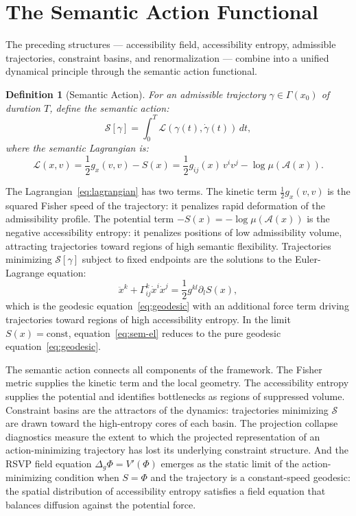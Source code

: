 \documentclass[12pt, oneside]{book}
\theoremstyle{plain-flyxion}
\theoremstyle{definition-flyxion}
\newtheorem{definition}[theorem]{Definition}
\newcommand{\A}{\mathcal{A}}
\begin{document}
\section{The Semantic Action Functional}

The preceding structures --- accessibility field, accessibility entropy, admissible
trajectories, constraint basins, and renormalization --- combine into a unified dynamical
principle through the semantic action functional.

\begin{definition}[Semantic Action]\label{def:action}
For an admissible trajectory $\gamma \in \Gamma(x_0)$ of duration $T$, define the
\emph{semantic action}:
\begin{equation}\label{eq:sem-action}
\mathcal{S}[\gamma] = \int_0^T \mathcal{L}(\gamma(t), \dot\gamma(t))\, dt,
\end{equation}
where the \emph{semantic Lagrangian} is:
\begin{equation}\label{eq:lagrangian}
\mathcal{L}(x, v) = \frac{1}{2} g_x(v, v) - S(x)
= \frac{1}{2} g_{ij}(x)\, v^i v^j - \log\mu(\A(x)).
\end{equation}
\end{definition}

The Lagrangian~\eqref{eq:lagrangian} has two terms. The kinetic term $\frac{1}{2}g_x(v,v)$
is the squared Fisher speed of the trajectory: it penalizes rapid deformation of the
admissibility profile. The potential term $-S(x) = -\log\mu(\A(x))$ is the negative
accessibility entropy: it penalizes positions of low admissibility volume, attracting
trajectories toward regions of high semantic flexibility. Trajectories minimizing
$\mathcal{S}[\gamma]$ subject to fixed endpoints are the solutions to the
Euler-Lagrange equation:
\begin{equation}\label{eq:sem-el}
\ddot{x}^k + \Gamma^k_{ij}\dot{x}^i\dot{x}^j = \frac{1}{2}g^{kl}\partial_l S(x),
\end{equation}
which is the geodesic equation~\eqref{eq:geodesic} with an additional force term driving
trajectories toward regions of high accessibility entropy. In the limit $S(x) = \mathrm{const}$,
equation~\eqref{eq:sem-el} reduces to the pure geodesic equation~\eqref{eq:geodesic}.

The semantic action connects all components of the framework. The Fisher metric supplies
the kinetic term and the local geometry. The accessibility entropy supplies the potential
and identifies bottlenecks as regions of suppressed volume. Constraint basins are the
attractors of the dynamics: trajectories minimizing $\mathcal{S}$ are drawn toward the
high-entropy cores of each basin. The projection collapse diagnostics measure the extent
to which the projected representation of an action-minimizing trajectory has lost its
underlying constraint structure. And the RSVP field equation $\Delta_g\Phi = V'(\Phi)$
emerges as the static limit of the action-minimizing condition when $S = \Phi$ and the
trajectory is a constant-speed geodesic: the spatial distribution of accessibility entropy
satisfies a field equation that balances diffusion against the potential force.
\end{document}
